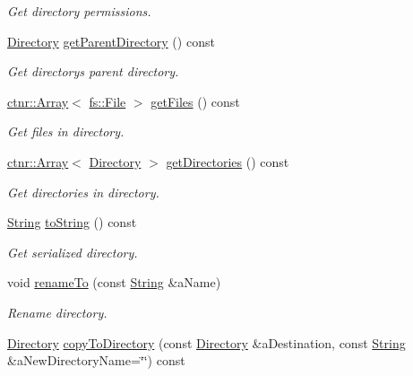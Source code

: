 \begin{DoxyCompactItemize}
\begin{DoxyCompactList}\small\item\em Get directory permissions. \end{DoxyCompactList}\item 
\hyperlink{classostk_1_1core_1_1fs_1_1_directory}{Directory} \hyperlink{classostk_1_1core_1_1fs_1_1_directory_afe68c26e4ef0ce175220a02b14ee3932}{get\+Parent\+Directory} () const
\begin{DoxyCompactList}\small\item\em Get directory\textquotesingle{}s parent directory. \end{DoxyCompactList}\item 
\hyperlink{classostk_1_1core_1_1ctnr_1_1_array}{ctnr\+::\+Array}$<$ \hyperlink{classostk_1_1core_1_1fs_1_1_file}{fs\+::\+File} $>$ \hyperlink{classostk_1_1core_1_1fs_1_1_directory_a3181d3a31a90b0095aaca907c9b978ab}{get\+Files} () const
\begin{DoxyCompactList}\small\item\em Get files in directory. \end{DoxyCompactList}\item 
\hyperlink{classostk_1_1core_1_1ctnr_1_1_array}{ctnr\+::\+Array}$<$ \hyperlink{classostk_1_1core_1_1fs_1_1_directory}{Directory} $>$ \hyperlink{classostk_1_1core_1_1fs_1_1_directory_a18ba6edc464768c26d2cbd821fa8b172}{get\+Directories} () const
\begin{DoxyCompactList}\small\item\em Get directories in directory. \end{DoxyCompactList}\item 
\hyperlink{classostk_1_1core_1_1types_1_1_string}{String} \hyperlink{classostk_1_1core_1_1fs_1_1_directory_a74bae41feb864f140298845b2dff432c}{to\+String} () const
\begin{DoxyCompactList}\small\item\em Get serialized directory. \end{DoxyCompactList}\item 
void \hyperlink{classostk_1_1core_1_1fs_1_1_directory_ae71a158b5efa776be263679b2b69bd26}{rename\+To} (const \hyperlink{classostk_1_1core_1_1types_1_1_string}{String} \&a\+Name)
\begin{DoxyCompactList}\small\item\em Rename directory. \end{DoxyCompactList}\item 
\hyperlink{classostk_1_1core_1_1fs_1_1_directory}{Directory} \hyperlink{classostk_1_1core_1_1fs_1_1_directory_a3403ab273accf228287aa4d86fc270ac}{copy\+To\+Directory} (const \hyperlink{classostk_1_1core_1_1fs_1_1_directory}{Directory} \&a\+Destination, const \hyperlink{classostk_1_1core_1_1types_1_1_string}{String} \&a\+New\+Directory\+Name=\char`\"{}\char`\"{}) const

\end{DoxyCompactItemize}
